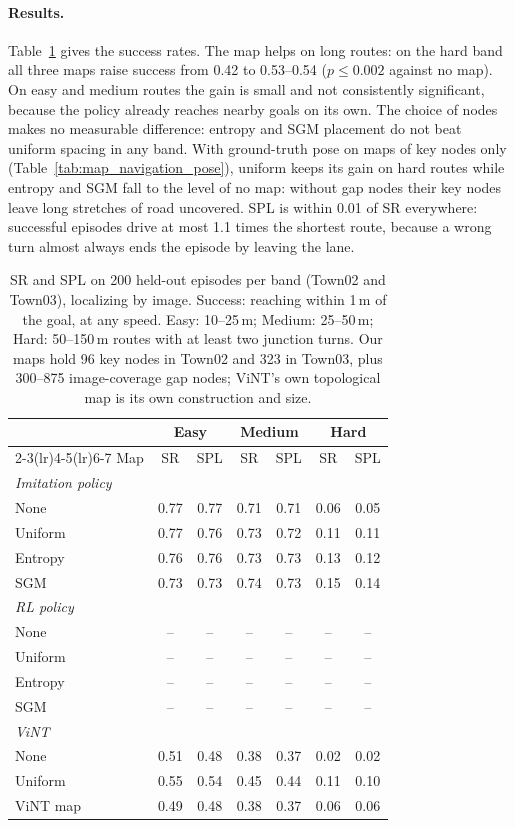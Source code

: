 \paragraph{Results.}
Table~\ref{tab:map_navigation} gives the success rates. The map helps on long
routes: on the hard band all three maps raise success from 0.42 to 0.53--0.54
($p \le 0.002$ against no map). On easy and medium routes the gain is small and
not consistently significant, because the policy already reaches nearby goals
on its own. The choice of nodes makes no measurable difference: entropy and SGM
placement do not beat uniform spacing in any band. With ground-truth pose on maps of key nodes only
(Table~\ref{tab:map_navigation_pose}), uniform keeps its gain on hard routes
while entropy and SGM fall to the level of no map: without gap nodes their key
nodes leave long stretches of road uncovered. SPL is within
0.01 of SR everywhere: successful episodes drive at most 1.1 times the shortest
route, because a wrong turn almost always ends the episode by leaving the lane.

\begin{table}[H]
\centering
\footnotesize
\setlength{\tabcolsep}{3.5pt}
\caption{SR and SPL on 200 held-out episodes per band (Town02 and Town03),
localizing by image. Success: reaching within 1\,m of the goal, at any speed.
Easy: 10--25\,m; Medium: 25--50\,m; Hard: 50--150\,m routes with at least two
junction turns. Our maps hold 96 key nodes in Town02 and 323 in Town03, plus
300--875 image-coverage gap nodes; ViNT's own topological map is its own
construction and size.}
\label{tab:map_navigation}
\begin{tabular}{lcccccc}
\toprule
 & \multicolumn{2}{c}{Easy} & \multicolumn{2}{c}{Medium} & \multicolumn{2}{c}{Hard} \\
\cmidrule(lr){2-3}\cmidrule(lr){4-5}\cmidrule(lr){6-7}
Map & SR & SPL & SR & SPL & SR & SPL \\
\midrule
\multicolumn{7}{l}{\textit{Imitation policy}} \\
None & 0.77 & 0.77 & 0.71 & 0.71 & 0.06 & 0.05 \\
Uniform & 0.77 & 0.76 & 0.73 & 0.72 & 0.11 & 0.11 \\
Entropy & 0.76 & 0.76 & 0.73 & 0.73 & 0.13 & 0.12 \\
SGM & 0.73 & 0.73 & 0.74 & 0.73 & 0.15 & 0.14 \\
\midrule
\multicolumn{7}{l}{\textit{RL policy}} \\
None & -- & -- & -- & -- & -- & -- \\
Uniform & -- & -- & -- & -- & -- & -- \\
Entropy & -- & -- & -- & -- & -- & -- \\
SGM & -- & -- & -- & -- & -- & -- \\
\midrule
\multicolumn{7}{l}{\textit{ViNT}~\cite{shah2023vint}} \\
None & 0.51 & 0.48 & 0.38 & 0.37 & 0.02 & 0.02 \\
Uniform & 0.55 & 0.54 & 0.45 & 0.44 & 0.11 & 0.10 \\
ViNT map & 0.49 & 0.48 & 0.38 & 0.37 & 0.06 & 0.06 \\
\bottomrule
\end{tabular}
\end{table}

